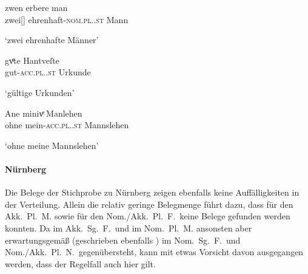 \begin{exe}
\ex \label{ex:adjaugs}
	\begin{xlist}
	\ex \label{ex:adjaugs_1}
		\gll zwen erbere man \\
			zwei[\MascM] ehrenhaft-\textsc{nom.pl.\MascM.st} Mann \\
		\begin{taggedline}{\parencites(Augsburg, 1290)[\pno~1270, 508.40]{cao2}}
		\trans `zwei ehrenhafte Männer'
		\end{taggedline}

	\ex \label{ex:adjaugs_2}
		\gll gvͤte Hantveſte \\
			gut-\textsc{acc.pl.\FemI.st} Urkunde \\
		\begin{taggedline}{\parencites(Augsburg, 1299)[\pno~3471, 557.21]{cao4}}
		\trans `gültige Urkunden'
		\end{taggedline}

	\ex \label{ex:adjaugs_3}
		\gll Ane minivͤ Manlehen \\
			ohne mein-\textsc{acc.pl.\NeutI.st} Mannslehen \\
		\begin{taggedline}{\parencites(Augsburg, 1291)[\pno~1363, 586.9]{cao2}}
		\trans `ohne meine Mannslehen'
		\end{taggedline}
	\end{xlist}
\end{exe}

\paragraph{Nürnberg}
\label{par:adjnuernberg}
Die Belege der Stichprobe zu Nürnberg zeigen ebenfalls keine Auffälligkeiten in
der Verteilung. Allein die relativ geringe Belegmenge führt dazu, dass für den
Akk.\ Pl.\ M. sowie für den Nom./Akk.\ Pl.\ F.\ keine Belege gefunden werden
konnten. Da  im Akk.\ Sg.\ F.\ und im Nom.\ Pl.\ M. ansonsten aber
erwartungsgemäß  (geschrieben ebenfalls ) im Nom.\ Sg.\ F.\
und Nom./Akk.\ Pl.\ N.\ gegenübersteht, kann mit etwas Vorsicht davon
ausgegangen werden, dass der Regelfall auch hier gilt.

